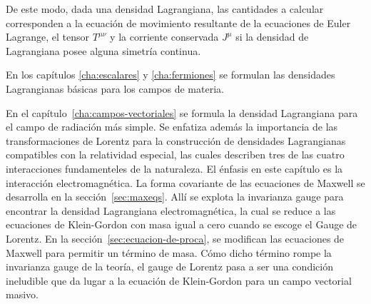 De este modo, dada una densidad Lagrangiana, las cantidades a calcular corresponden a la ecuación de movimiento resultante de la ecuaciones de Euler Lagrange, el tensor $T^{\mu\nu}$ y la corriente conservada $J^\mu$ si la densidad de Lagrangiana posee alguna simetría continua.



En los capítulos \ref{cha:escalares} y \ref{cha:fermiones} se formulan las densidades Lagrangianas básicas para los campos de materia.

En el capítulo~\ref{cha:campos-vectoriales} se formula la densidad Lagrangiana para el campo de radiación más simple. Se enfatiza además la importancia de las transformaciones de Lorentz para la construcción de densidades Lagrangianas compatibles con la relatividad especial, las cuales describen tres de las cuatro interacciones fundamenteles de la naturaleza.
El énfasis en este capítulo es la interacción electromagnética. La forma covariante de las ecuaciones de Maxwell se desarrolla en la sección~\ref{sec:maxeqs}. Allí se explota la invarianza gauge para encontrar la densidad Lagrangiana electromagnética, la cual se reduce a las ecuaciones de Klein-Gordon con masa igual a cero cuando se escoge el Gauge de Lorentz. En la sección~\ref{sec:ecuacion-de-proca}, se modifican las ecuaciones de Maxwell para permitir un término de masa. Cómo dicho término rompe la invarianza gauge de la teoría, el gauge de Lorentz pasa a ser una condición ineludible que da lugar a la ecuación de Klein-Gordon  para un campo vectorial masivo.

